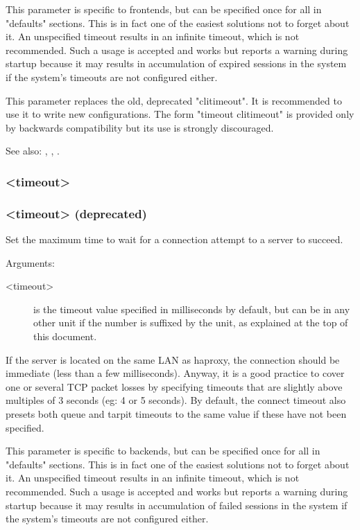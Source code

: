 {  This parameter is specific to frontends, but can be specified once for all in
  "defaults" sections. This is in fact one of the easiest solutions not to
  forget about it. An unspecified timeout results in an infinite timeout, which
  is not recommended. Such a usage is accepted and works but reports a warning
  during startup because it may results in accumulation of expired sessions in
  the system if the system's timeouts are not configured either.

  This parameter replaces the old, deprecated "clitimeout". It is recommended
  to use it to write new configurations. The form "timeout clitimeout" is
  provided only by backwards compatibility but its use is strongly discouraged.

  See also: , , .

\subsubsection[timeout connect]{ <timeout>}
\subsubsection[timeout contimeout]{ <timeout> (deprecated)}

  Set the maximum time to wait for a connection attempt to a server to succeed.


  Arguments:
  \begin{description}
  \item[<timeout>] is the timeout value specified in milliseconds by default, but
              can be in any other unit if the number is suffixed by the unit,
              as explained at the top of this document.
  \end{description}

  If the server is located on the same LAN as haproxy, the connection should be
  immediate (less than a few milliseconds). Anyway, it is a good practice to
  cover one or several TCP packet losses by specifying timeouts that are
  slightly above multiples of 3 seconds (eg: 4 or 5 seconds). By default, the
  connect timeout also presets both queue and tarpit timeouts to the same value
  if these have not been specified.

  This parameter is specific to backends, but can be specified once for all in
  "defaults" sections. This is in fact one of the easiest solutions not to
  forget about it. An unspecified timeout results in an infinite timeout, which
  is not recommended. Such a usage is accepted and works but reports a warning
  during startup because it may results in accumulation of failed sessions in
  the system if the system's timeouts are not configured either.

}
